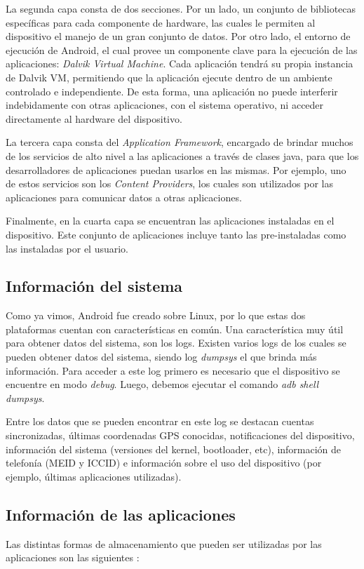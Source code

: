 La segunda capa consta de dos secciones. Por un lado, un conjunto de bibliotecas específicas para cada componente de hardware, las cuales le permiten al dispositivo el manejo de un gran conjunto de datos. Por otro lado, el entorno de ejecución de Android, el cual provee un componente clave para la ejecución de las aplicaciones: \emph{Dalvik Virtual Machine}. Cada aplicación tendrá su propia instancia de Dalvik VM, permitiendo que la aplicación ejecute dentro de un ambiente controlado e independiente. De esta forma, una aplicación no puede interferir indebidamente con otras aplicaciones, con el sistema operativo, ni acceder directamente al hardware del dispositivo.

La tercera capa consta del \emph{Application Framework}, encargado de brindar muchos de los servicios de alto nivel a las aplicaciones a través de clases java, para que los desarrolladores de aplicaciones puedan usarlos en las mismas. Por ejemplo, uno de estos servicios son los \emph{Content Providers}, los cuales son utilizados por las aplicaciones para comunicar datos a otras aplicaciones.

Finalmente, en la cuarta capa se encuentran las aplicaciones instaladas en el dispositivo. Este conjunto de aplicaciones incluye tanto las pre-instaladas como las instaladas por el usuario.

\subsection{Información del sistema}
Como ya vimos, Android fue creado sobre Linux, por lo que estas dos plataformas cuentan con características en común. Una característica muy útil para obtener datos del sistema, son los logs. Existen varios logs de los cuales se pueden obtener datos del sistema, siendo log \emph{dumpsys} el que brinda más información. Para acceder a este log primero es necesario que el dispositivo se encuentre en modo \emph{debug}. Luego, debemos ejecutar el comando \textit{adb shell dumpsys}.

Entre los datos que se pueden encontrar en este log se destacan cuentas sincronizadas, últimas coordenadas GPS conocidas, notificaciones del dispositivo, información del sistema (versiones del kernel, bootloader, etc), información de telefonía (MEID y ICCID) e información sobre el uso del dispositivo (por ejemplo, últimas aplicaciones utilizadas).

\subsection{Información de las aplicaciones}
Las distintas formas de almacenamiento que pueden ser utilizadas por las aplicaciones son las siguientes \cite{androidStrg}:

